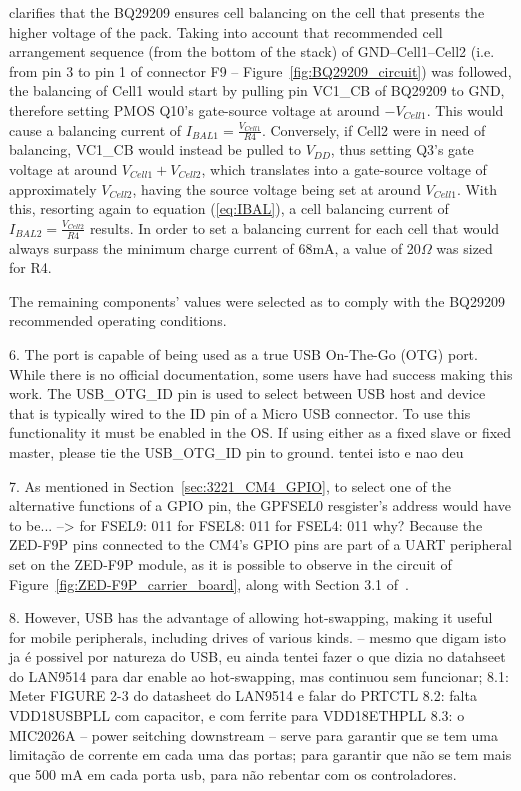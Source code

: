 \cite{bq29209} clarifies that the BQ29209 ensures cell balancing on the cell that presents the higher voltage of the pack.
Taking into account that recommended cell arrangement sequence (from the bottom of the stack) of GND--Cell1--Cell2 (i.e. from pin 3 to pin 1 of connector F9 -- Figure~\ref{fig:BQ29209_circuit}) was followed, the balancing of Cell1 would start by pulling pin VC1\_CB of BQ29209 to GND, therefore setting PMOS Q10's gate-source voltage at around $-V_{Cell1}$. This would cause a balancing current of $I_{BAL1}=\frac{V_{Cell1}}{R4}$. Conversely, if Cell2 were in need of balancing, VC1\_CB would instead be pulled to $V_{DD}$, thus setting Q3's gate voltage at around $V_{Cell1}+V_{Cell2}$, which translates into a gate-source voltage of approximately $V_{Cell2}$, having the source voltage being set at around $V_{Cell1}$. With this, resorting again to equation (\ref{eq:IBAL}), a cell balancing current of $I_{BAL2}=\frac{V_{Cell2}}{R4}$ results. In order to set a balancing current for each cell that would always surpass the minimum charge current of 68mA, a value of 20$\Omega$ was sized for R4. 

The remaining components' values were selected as to comply with the BQ29209 recommended operating conditions.





6. The port is capable of being used as a true USB On-The-Go (OTG) port. While there is no official documentation, some users have had success making this work. The USB\_OTG\_ID pin is used to select between USB host and device that is typically wired to the ID pin of a Micro USB connector. To use this functionality it must be enabled in the OS. If using either as a fixed slave or fixed master, please tie the USB\_OTG\_ID pin to ground. tentei isto e nao deu

7. As mentioned in Section~\ref{sec:3221_CM4_GPIO}, to select one of the alternative functions of a GPIO pin, the GPFSEL0 resgister's address would have to be... -->
    for FSEL9: 011
    for FSEL8: 011
    for FSEL4: 011
why? Because the ZED-F9P pins connected to the CM4's GPIO pins are part of a UART peripheral set on the ZED-F9P module, as it is possible to observe in the circuit of Figure~\ref{fig:ZED-F9P_carrier_board}, along with Section 3.1 of~\cite{ZED_F9P}.

8. %
However, USB has the advantage of allowing hot-swapping, making it useful for mobile peripherals, including drives of various kinds. -- mesmo que digam isto ja é possivel por natureza do USB, eu ainda tentei fazer o que dizia no datahseet do LAN9514 para dar enable ao hot-swapping, mas continuou sem funcionar;
8.1: Meter FIGURE 2-3 do datasheet do LAN9514 e falar do PRTCTL
8.2: falta VDD18USBPLL com capacitor, e com ferrite para VDD18ETHPLL
8.3: o MIC2026A -- power seitching downstream -- serve para garantir que se tem uma limitação de corrente em cada uma das portas; para garantir que não se tem mais que 500 mA em cada porta usb, para não rebentar com os controladores.

